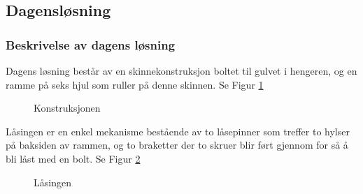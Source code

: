 \subsection{Dagensløsning}
\subsubsection{Beskrivelse av dagens løsning}

Dagens løsning består av en skinnekonstruksjon boltet til gulvet i hengeren, og en ramme på seks hjul som ruller på denne skinnen. Se Figur \ref{F1} 
\begin{figure}[H]
\centering   
{}
\caption{Konstruksjonen}
\label{F1}
\end{figure}

Låsingen er en enkel mekanisme bestående av to låsepinner som treffer to hylser på baksiden av rammen, og to braketter der to skruer blir ført gjennom for så å bli låst med en bolt. Se Figur \ref{F2} 

\begin{figure}[H]
\centering   
{}
\caption{Låsingen}
\label{F2}
\end{figure}

